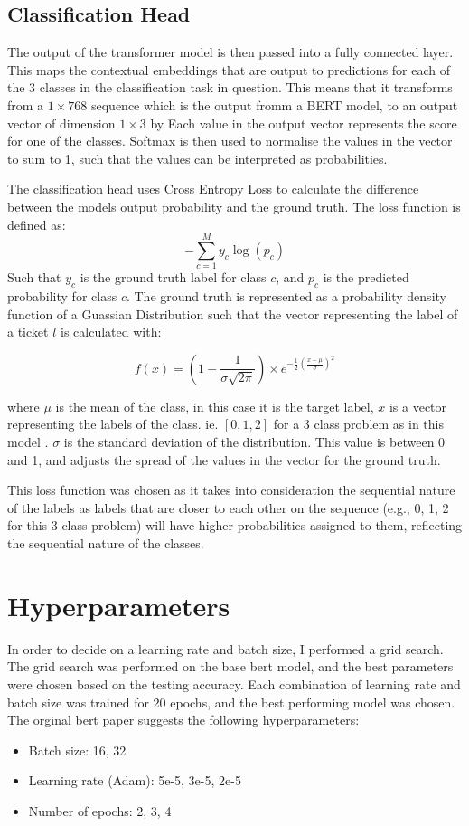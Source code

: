 \documentclass{UoYCSproject}
\begin{document}
    \subsection{Classification Head}\label{subsec:Classification-Head}
    The output of the transformer model is then passed into a fully connected layer.
    This maps the contextual embeddings that are output to predictions for each of the 3 classes in the classification task in question.
    This means that it transforms from a $1\times768$ sequence which is the output fromm a BERT model, to an output vector of dimension $1\times3$ by
    Each value in the output vector represents the score for one of the classes.
    Softmax is then used to normalise the values in the vector to sum to 1, such that the values can be interpreted as probabilities.

    The classification head uses Cross Entropy Loss to calculate the difference between the models output probability and the ground truth.
    The loss function is defined as:
    \[-\sum_{c=1}^My_{c}\log(p_{c})\]
    Such that $y_{c}$ is the ground truth label for class $c$, and $p_{c}$ is the predicted probability for class $c$.
    The ground truth is represented as a probability density function of a Guassian Distribution such that the vector representing the label of a ticket $l$ is calculated with:

    \[f(x) = (1-\frac{1}{\sigma \sqrt {2\pi}}) \times e ^{-\frac{1}{2}(\frac{x-\mu }{\sigma})^{2}}\]

    where $\mu$ is the mean of the class, in this case it is the target label, $x$ is a vector representing the labels of the class. ie. $[0,1,2]$ for a 3 class problem as in this model .
    $\sigma$ is the standard deviation of the distribution.
    This value is between 0 and 1, and adjusts the spread of the values in the vector for the ground truth.

    This loss function was chosen as it takes into consideration the sequential nature of the labels as labels that are closer to each other on the sequence (e.g., 0, 1, 2 for this 3-class problem) will have higher probabilities assigned to them, reflecting the sequential nature of the classes.

    \section{Hyperparameters}\label{sec:hyperparameters}
    In order to decide on a learning rate and batch size, I performed a grid search.
    The grid search was performed on the base bert model, and the best parameters were chosen based on the testing accuracy.
    Each combination of learning rate and batch size was trained for 20 epochs, and the best performing model was chosen.
    The orginal bert paper suggests the following hyperparameters:
    \begin{itemize}
        \item Batch size: 16, 32
        \item Learning rate (Adam): 5e-5, 3e-5, 2e-5
        \item Number of epochs: 2, 3, 4
    \end{itemize}
\end{document}
